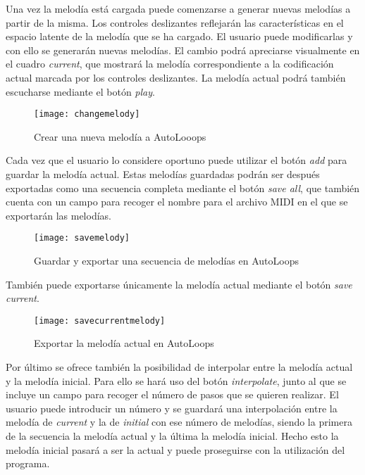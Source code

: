 Una vez la melodía está cargada puede comenzarse a generar nuevas melodías a partir de la misma. Los controles deslizantes reflejarán las características en el espacio latente de la melodía que se ha cargado. El usuario puede modificarlas y con ello se generarán nuevas melodías. El cambio podrá apreciarse visualmente en el cuadro \textit{current}, que mostrará la melodía correspondiente a la codificación actual marcada por los controles deslizantes. La melodía actual podrá también escucharse mediante el botón \textit{play}.

\begin{figure}[htpb]
  \centering
  \texttt{[image: changemelody]}
  \caption{Crear una nueva melodía a AutoLooops}
  \label{fig:changemelody}
\end{figure}

Cada vez que el usuario lo considere oportuno puede utilizar el botón \textit{add} para guardar la melodía actual. Estas melodías guardadas podrán ser después exportadas como una secuencia completa mediante el botón \textit{save all}, que también cuenta con un campo para recoger el nombre para el archivo MIDI en el que se exportarán las melodías.

\begin{figure}[htpb]
  \centering
  \texttt{[image: savemelody]}
  \caption{Guardar y exportar una secuencia de melodías en AutoLoops}
  \label{fig:savemelody}
\end{figure}

También puede exportarse únicamente la melodía actual mediante el botón \textit{save current}.

\begin{figure}[htpb]
  \centering
  \texttt{[image: savecurrentmelody]}
  \caption{Exportar la melodía actual en AutoLoops}
  \label{fig:savecurrentmelody}
\end{figure}

Por último se ofrece también la posibilidad de interpolar entre la melodía actual y la melodía inicial. Para ello se hará uso del botón \textit{interpolate}, junto al que se incluye un campo para recoger el número de pasos que se quieren realizar. El usuario puede introducir un número y se guardará una interpolación entre la melodía de \textit{current} y la de \textit{initial} con ese número de melodías, siendo la primera de la secuencia la melodía actual y la última la melodía inicial. Hecho esto la melodía inicial pasará a ser la actual y puede proseguirse con la utilización del programa.

